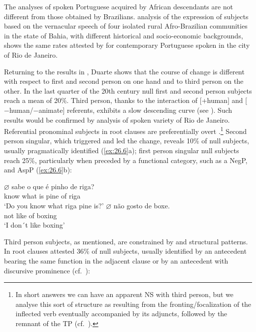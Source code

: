 \documentclass[output=paper]{langsci/langscibook}
\begin{document}
The analyses of spoken Portuguese acquired by  African descendants are not
different from those obtained by Brazilians.  analysis
of the expression of subjects based on the vernacular speech of four isolated
rural Afro-Brazilian communities in the state of Bahia, with different
historical and socio-economic backgrounds, shows the same rates attested by
\citet{Duarte1995} for contemporary Portuguese spoken in the city of Rio de
Janeiro.

Returning to the results in , Duarte shows that the course
of change is different with respect to first and  second person on one hand and
to third person on the other. In the last quarter of the 20th century null
first and second person subjects reach a mean of 20\%. Third person, thanks to
the interaction of [+human] and [$-$human/$-$animate] referents, exhibits a slow
descending curve (see \citealt{CyrinoEtAl2000}). Such results would be
confirmed by  analysis of spoken variety of Rio de Janeiro.
Referential pronominal subjects in root clauses are preferentially overt
\parencite{Duarte1995}.\footnote{In short answers we can have an apparent NS
    with third person, but we analyse this sort of structure as resulting from
    the fronting/focalization of the inflected verb eventually
    accompanied by its adjuncts, followed by the remnant  of the
    TP (cf.\ \citealt{Kato2016}).} Second person singular, which triggered and
    led the change, reveals 10\% of null subjects, usually pragmatically
    identified (\ref{ex:26.6}a); first person singular null subjects reach
    25\%, particularly when preceded by a functional category, such as a NegP,
    and AspP (\ref{ex:26.6}b):

\ea\label{ex:26.6}
    \ea
    \gll	$\varnothing$\tss{\Ssg} sabe {o que} é pinho de riga?\\
            {} know what is pine of riga\\
	\glt	‘Do you know what riga pine is?’
    \ex
	\gll	$\varnothing$\tss{\Fsg} não gosto de boxe.\\
            {} not like    of boxing\\
	\glt	‘I don´t like boxing’
    \z
\z

Third person subjects, as mentioned, are constrained by  and structural
patterns. In root clauses \citet{Duarte1995} attested 36\% of null subjects,
usually identified by an antecedent bearing the same function in the adjacent
clause or by an antecedent with discursive prominence (cf.\
\citealt{BarbosaDuarteKato2005,KatoDuarte2014b}):
\end{document}

